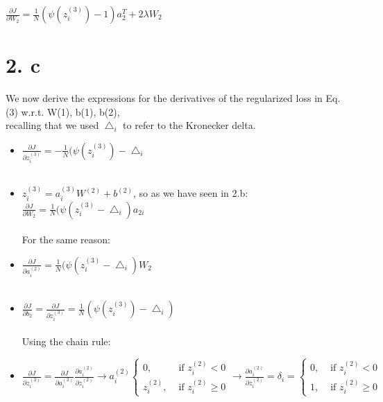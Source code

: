 \documentclass[
	12pt, %
]{fphw}
\begin{document}
$\frac{\partial J}{\partial W_2} = \frac{1}{N} (\psi(z_{i}^{(3)}) - 1) a_{2}^{T} + 2\lambda W_2$


\newpage
\section* {2. c}

We now derive the expressions for the derivatives of the regularized loss in Eq. (3) w.r.t. W(1), b(1), b(2),\\
recalling that we used $\bigtriangleup_i$ to refer to the Kronecker delta. \\

\begin{itemize}

\item $\frac{\partial J}{\partial z_{i}^{(3)}} = - \frac{1}{N} (\psi (z_{i}^{(3)}) - \bigtriangleup_i$ \\ \\

\item $z_{i}^{(3)} = a_{i}^{(3)} W^{(2)} + b^{(2)}$, so as we have seen in 2.b: \\ 

$\frac {\partial J}{\partial W_2} = \frac {1}{N} (\psi (z_{i}^{(3)} - \bigtriangleup_i) a_{2i} $\\ \\

For the same reason:

\item $\frac {\partial J}{\partial a_{i}^{(2)}} = \frac{1}{N} (\psi (z_{i}^{(3)} - \bigtriangleup_i) W_2$ \\	\\

\item $\frac {\partial J}{\partial b_2} = \frac {\partial J}{\partial z_{i}^{(3)}} = \frac{1}{N} (\psi(z_{i}^{(3)}) - \bigtriangleup_i)$ \\ \\

Using the chain rule:

\item $\frac {\partial J}{\partial z_{i}^{(2)}} = \frac {\partial J}{\partial a_{i}^{(2)}} \frac {\partial a_{i}^{(2)}}{\partial z_{i}^{(2)}} \rightarrow a_{i}^{(2)}\left\{\begin{array}{ll}
0, & \text { if } z_{i}^{(2)}<0 \\
z_{i}^{(2)}, & \text { if } z_{i}^{(2)}\geq0
\end{array}\right.
\rightarrow \frac {\partial a_{i}^{(2)}}{\partial z_{i}^{(2)}} = \delta_i = 
\left\{\begin{array}{ll}
0, & \text { if } z_{i}^{(2)}<0 \\
1, & \text { if } z_{i}^{(2)}\geq0
\end{array}\right.
$ \\


\end{itemize}
\end{document}
